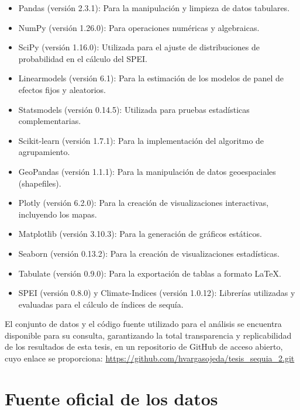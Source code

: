 \begin{itemize}
    \setlength{\itemsep}{0pt}  %
    \setlength{\parsep}{0pt}   %
    \setlength{\topsep}{0pt}   %
    \item Pandas (versión 2.3.1): Para la manipulación y limpieza de datos tabulares.
    \item NumPy (versión 1.26.0): Para operaciones numéricas y algebraicas.
    \item SciPy (versión 1.16.0): Utilizada para el ajuste de distribuciones de probabilidad en el cálculo del SPEI.
    \item Linearmodels (versión 6.1): Para la estimación de los modelos de panel de efectos fijos y aleatorios.
    \item Statsmodels (versión 0.14.5): Utilizada para pruebas estadísticas complementarias.
    \item Scikit-learn (versión 1.7.1): Para la implementación del algoritmo de agrupamiento.
    \item GeoPandas (versión 1.1.1): Para la manipulación de datos geoespaciales (shapefiles).
    \item Plotly (versión 6.2.0): Para la creación de visualizaciones interactivas, incluyendo los mapas.
    \item Matplotlib (versión 3.10.3): Para la generación de gráficos estáticos.
    \item Seaborn (versión 0.13.2): Para la creación de visualizaciones estadísticas.
    \item Tabulate (versión 0.9.0): Para la exportación de tablas a formato LaTeX.
    \item SPEI (versión 0.8.0) y Climate-Indices (versión 1.0.12): Librerías utilizadas y evaluadas para el cálculo de índices de sequía.
\end{itemize}

El conjunto de datos y el código fuente utilizado para el análisis se encuentra disponible para su consulta, garantizando la total transparencia y replicabilidad de los resultados de esta tesis, en un repositorio de GitHub de acceso abierto, cuyo enlace se proporciona:
\url{https://github.com/hvargasojeda/tesis_sequia_2.git}

\chapter{Fuente oficial de los datos}\label{apendice:fuente_datos}

